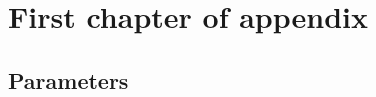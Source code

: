 \chapter{First chapter of appendix}
\label{chap:Appendix:A}

\section{Parameters}
\label{sec:Appendix:Parameter}

